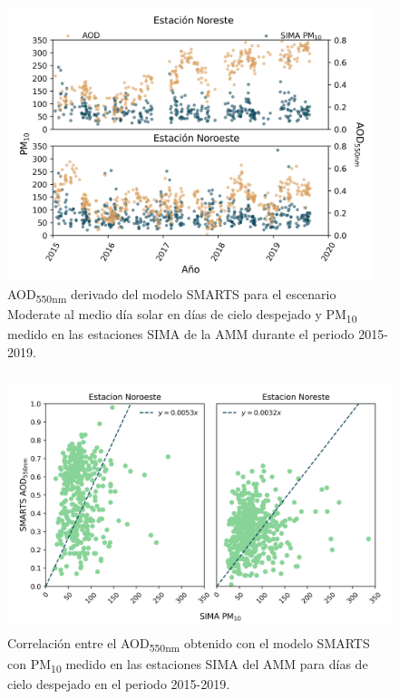 \documentclass{article}
\begin{document}
\begin{center}
\begin{minipage}{0.45\linewidth}
    \begin{figure}[H]
        \centering
        \includegraphics[height=8cm]{images/AODsandPM10.png}
        \caption{AOD\textsubscript{550nm} derivado del modelo SMARTS para el escenario Moderate al medio día solar en días de cielo despejado y PM\textsubscript{10} medido en las estaciones SIMA de la AMM durante el periodo 2015-2019.}
    \end{figure}
\end{minipage}
\begin{minipage}{0.45\linewidth}
    \begin{figure}[H]
        \centering
        \includegraphics[height=7.5cm]{images/AODvsPM10.png}
        \caption{Correlación entre el AOD\textsubscript{550nm} obtenido con el modelo SMARTS con PM\textsubscript{10} medido en las estaciones SIMA del AMM para días de cielo despejado en el periodo 2015-2019.}
    \end{figure}
\end{minipage}
\end{center}
\end{document}
